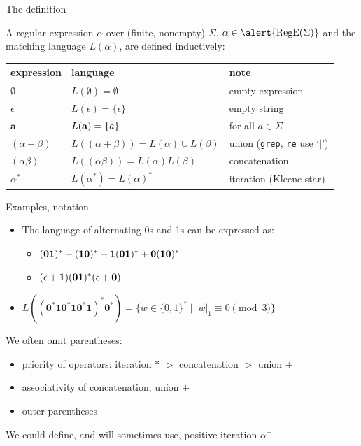 \documentclass[handout]{beamer}
\begin{document}
\begin{frame}{The definition}
    
    A \alert{regular expression} $\alpha$ over (finite, nonempty) $\Sigma$, $\alpha\in \alert{\RegE(\Sigma)}$ and the matching language \alert{$L(\alpha)$}, are defined inductively:

    \begin{tabular}{l l l}
        \\\hline
        \textbf{expression} & \textbf{language} & \textbf{note}\\\hline
        $\emptyset$ & $L(\emptyset)=\emptyset$ & empty expression\\
        $\epsilon$ & $L(\epsilon)=\{\epsilon\}$ & empty string \\
        
        $\textbf{a}$ & $L({\bf a})=\{a\}$ & for all $a\in \Sigma$\\
         $(\alpha+\beta)$ & $L((\alpha+\beta))=L(\alpha)\cup L(\beta) $ & union (\texttt{grep}, \texttt{re} use `$|$')\\
         $(\alpha\beta)$ & $L((\alpha\beta))=L(\alpha)L(\beta)$ &concatenation \\
         $\alpha^*$ & $L(\alpha^*)=L(\alpha)^*$ & iteration (Kleene star)
    \end{tabular}
    
\end{frame}


\begin{frame}{Examples, notation}

    \begin{example}
        \begin{itemize}
            \item The language of alternating 0s and 1s can be expressed as:
            \begin{itemize}
                \item $({\bf 01})^*+({\bf 10})^*+{\bf 1}({\bf 01})^*+{\bf 0}({\bf 10})^*$
                \item $(\epsilon+{\bf 1})({\bf 01})^*(\epsilon+{\bf 0})$
            \end{itemize}
            \item $L((\textbf{0}^*\textbf{10}^*\textbf{10}^*\textbf{1})^*\textbf{0}^*)=\{w\in \{0,1\}^*\mid |w|_1 \equiv 0\pmod 3\}$
        \end{itemize}
    \end{example}

    We often omit parentheses:
    \begin{itemize}
        \item priority of operators: iteration $*$ $>$ concatenation $>$ union $+$
        \item associativity of concatenation, union $+$
        \item outer parentheses
    \end{itemize}

    We could define, and will sometimes use, positive iteration $\alpha^+$

\end{frame}
\end{document}
